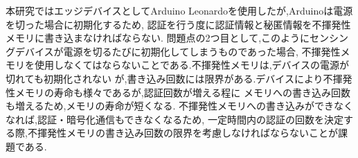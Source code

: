 本研究ではエッジデバイスとしてArduino Leonardoを使用したが,Arduinoは電源を切った場合に初期化するため,
認証を行う度に認証情報と秘匿情報を不揮発性メモリに書き込まなければならない.
問題点の2つ目として,このようにセンシングデバイスが電源を切るたびに初期化してしまうものであった場合,
不揮発性メモリを使用しなくてはならないことである.不揮発性メモリは,デバイスの電源が切れても初期化されない
が,書き込み回数には限界がある.デバイスにより不揮発性メモリの寿命も様々であるが,認証回数が増える程に
メモリへの書き込み回数も増えるため,メモリの寿命が短くなる.
不揮発性メモリへの書き込みができなくなれば,認証・暗号化通信もできなくなるため,
一定時間内の認証の回数を決定する際,不揮発性メモリの書き込み回数の限界を考慮しなければならないことが課題である.

